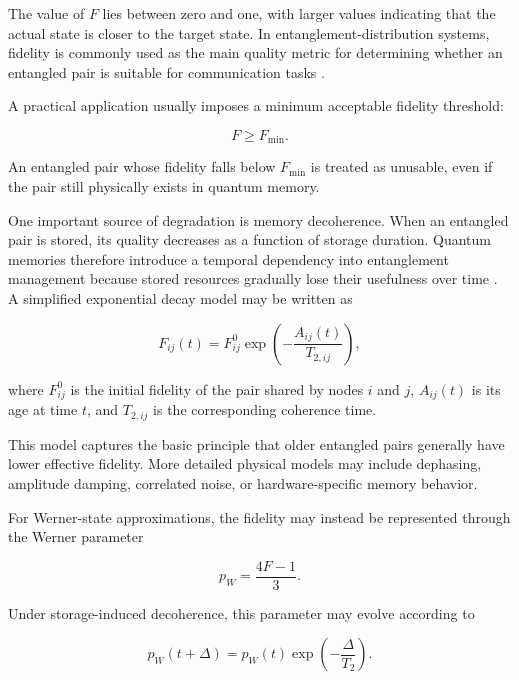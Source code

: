 The value of $F$ lies between zero and one, with larger values indicating that the actual state is closer to the target state. In entanglement-distribution systems, fidelity is commonly used as the main quality metric for determining whether an entangled pair is suitable for communication tasks \cite{pant2019routing,halder2024optimal}.

A practical application usually imposes a minimum acceptable fidelity threshold:

\begin{equation}
    F \geq F_{\min}.
\end{equation}

An entangled pair whose fidelity falls below $F_{\min}$ is treated as unusable, even if the pair still physically exists in quantum memory.

One important source of degradation is memory decoherence. When an entangled pair is stored, its quality decreases as a function of storage duration. Quantum memories therefore introduce a temporal dependency into entanglement management because stored resources gradually lose their usefulness over time \cite{vanmeter2014quantum,ercetin2026fidelityage,wang2023memory,zheng2024decoherence}. A simplified exponential decay model may be written as

\begin{equation}
    F_{ij}(t)
    =
    F_{ij}^{0}
    \exp
    \left(
    -\frac{A_{ij}(t)}{T_{2,ij}}
    \right),
\end{equation}

where $F_{ij}^{0}$ is the initial fidelity of the pair shared by nodes $i$ and $j$, $A_{ij}(t)$ is its age at time $t$, and $T_{2,ij}$ is the corresponding coherence time.

This model captures the basic principle that older entangled pairs generally have lower effective fidelity. More detailed physical models may include dephasing, amplitude damping, correlated noise, or hardware-specific memory behavior.

For Werner-state approximations, the fidelity may instead be represented through the Werner parameter

\begin{equation}
    p_{W}
    =
    \frac{4F-1}{3}.
\end{equation}

Under storage-induced decoherence, this parameter may evolve according to

\begin{equation}
    p_{W}(t+\Delta)
    =
    p_{W}(t)
    \exp
    \left(
    -\frac{\Delta}{T_2}
    \right).
\end{equation}


